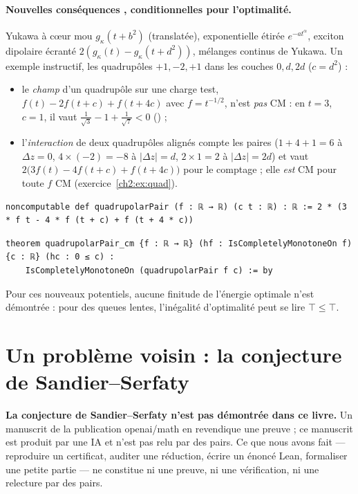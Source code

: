 \paragraph{Nouvelles conséquences \tierA, conditionnelles pour l'optimalité.} Yukawa à c\oe{}ur mou
$g_\kappa(t+b^2)$ (translatée), exponentielle étirée $e^{-at^\alpha}$, exciton dipolaire écranté
$2(g_\kappa(t)-g_\kappa(t+d^2))$, mélanges continus de Yukawa. Un exemple instructif, les quadrupôles $+1,-2,+1$ dans
les couches $0,d,2d$ ($c=d^2$) :
\begin{itemize}
\item le \emph{champ} d'un quadrupôle sur une charge test, $f(t)-2f(t+c)+f(t+4c)$ avec $f=t^{-1/2}$, n'est \emph{pas}
CM : en $t=3$, $c=1$, il vaut $\frac1{\sqrt3}-1+\frac1{\sqrt7}<0$ () ;
\item l'\emph{interaction} de deux quadrupôles alignés compte les paires ($1+4+1=6$ à $\Delta z=0$, $4\times(-2)=-8$ à
$|\Delta z|=d$, $2\times1=2$ à $|\Delta z|=2d$) et vaut $2\bigl(3f(t)-4f(t+c)+f(t+4c)\bigr)$ \tierC{} pour le comptage ;
elle \emph{est} CM pour toute $f$ CM (exercice~\ref{ch2:ex:quad}).
\end{itemize}
\begin{leanbox}
\begin{lstlisting}[style=chdeux]
noncomputable def quadrupolarPair (f : ℝ → ℝ) (c t : ℝ) : ℝ := 2 * (3 * f t - 4 * f (t + c) + f (t + 4 * c))
\end{lstlisting}
\begin{lstlisting}[style=chdeux]
theorem quadrupolarPair_cm {f : ℝ → ℝ} (hf : IsCompletelyMonotoneOn f) {c : ℝ} (hc : 0 ≤ c) :
    IsCompletelyMonotoneOn (quadrupolarPair f c) := by
\end{lstlisting}
\end{leanbox}
\noindent Pour ces nouveaux potentiels, aucune finitude de l'énergie optimale n'est démontrée : pour des queues lentes,
l'inégalité d'optimalité peut se lire $\top\le\top$.

\section{Un problème voisin : la conjecture de Sandier--Serfaty}\label{ch2:sec:ss}

\begin{warnbox}[: statut]
\textbf{La conjecture de Sandier--Serfaty n'est pas démontrée dans ce livre.} Un manuscrit de la publication openai/math
en revendique une preuve ; ce manuscrit est produit par une IA et n'est pas relu par des pairs. Ce que nous avons
fait --- reproduire un certificat, auditer une réduction, écrire un énoncé Lean, formaliser une petite partie --- ne
constitue ni une preuve, ni une vérification, ni une relecture par des pairs.
\end{warnbox}

